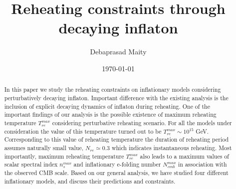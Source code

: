 \documentclass[prl,twocolumn,superscriptaddress,doublespace]{revtex4}%
\begin{document}

\title{Reheating constraints through decaying inflaton}%

\author{Debaprasad Maity}
%


\date{\today}


\begin{abstract}
In this paper we study the reheating constraints on inflationary models considering perturbatively decaying inflaton. Important difference with the existing analysis is the inclusion of explicit decaying dynamics of inflaton during reheating. One of the important findings of our analysis is the possible existence of maximum reheating temperature $T_{re}^{max}$ considering perturbative reheating scenario. For all the models under consideration the value of this temperature turned out to be $T_{re}^{max} \sim 10^{15}$ GeV. Corresponding to this value of reheating temperature the duration of reheating period assumes naturally small value, $N_{re} \simeq 0.3$ which indicates instantaneous reheating. Most importantly, maximum reheating temperature $T^{max}_{re}$ also leads to a maximum values of scalar spectral index $n^{max}_s$ and inflationary e-folding number  $N^{max}_{cmb}$ in association with the observed CMB scale. Based on our general analysis, we have studied four different inflationary models, and discuss their predictions and constraints.
\end{abstract}
\maketitle
\end{document}
